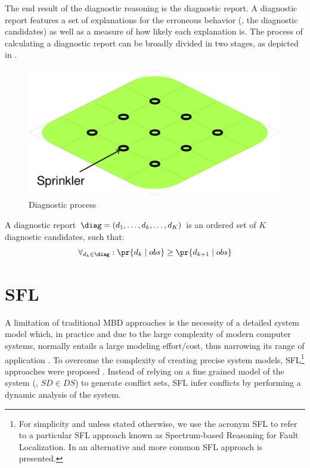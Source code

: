 The end result of the diagnostic reasoning is the diagnostic
report.
%
A diagnostic report features a set of explanations for the erroneous
behavior (\ie, the diagnostic candidates) as well as a measure of how
likely each explanation is.
%
The process of calculating a diagnostic report can be broadly divided
in two stages, as depicted in .

\begin{figure}[ht]
  \includegraphics[page=4]{figures/introduction/figures/main.pdf}
  \caption{Diagnostic process\label{fig:intro:diagnostic-process}}
\end{figure}

\begin{definition}
  \label{def:intro:diagnostic-report}

  A diagnostic report
  $\diag = \left(d_1, \dots, d_k, \dots, d_K\right)$ is an ordered set
  of $K$ diagnostic candidates, such that:
  \begin{equation}
    \forall_{d_k\in \diag} : \pr{d_k \mid obs} \geq \pr{d_{k+1} \mid obs}
  \end{equation}
\end{definition}


\section{\acl{SFL}}
\label{sec:intro:SFL}
A limitation of traditional \ac{MBD} approaches is the necessity of a
detailed system model which, in practice and due to the large
complexity of modern computer systems, normally entails a large
modeling effort/cost, thus narrowing its range of application
\cite{Pietersma06,Horn01}.
%
To overcome the complexity of creating precise system models,
\acf{SFL}\footnote{For simplicity and unless stated otherwise, we use
  the acronym \ac{SFL} to refer to a particular \ac{SFL} approach
  known as Spectrum-based Reasoning for Fault Localization.
  In  an
  alternative and more common \ac{SFL} approach is presented.}
approaches were proposed \cite{Abreu09a,Kleer09,Casanova13}.
%
Instead of relying on a fine grained model of the system (\ie,
$SD \in DS$) to generate conflict sets, \ac{SFL} infer conflicts by
performing a dynamic analysis of the system.


